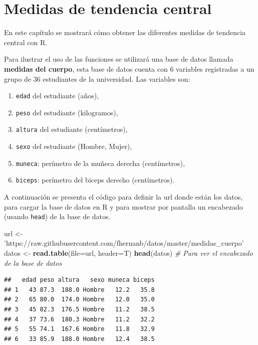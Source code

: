 \documentclass[10pt,]{krantz}
\makeatletter
\newenvironment{Shaded}{\begin{snugshade}}{\end{snugshade}}
\newcommand{\KeywordTok}[1]{\textcolor[rgb]{0.13,0.29,0.53}{\textbf{{#1}}}}
\newcommand{\DataTypeTok}[1]{\textcolor[rgb]{0.13,0.29,0.53}{{#1}}}
\newcommand{\StringTok}[1]{\textcolor[rgb]{0.31,0.60,0.02}{{#1}}}
\newcommand{\CommentTok}[1]{\textcolor[rgb]{0.56,0.35,0.01}{\textit{{#1}}}}
\newcommand{\NormalTok}[1]{{#1}}
\providecommand{\tightlist}{%
  \setlength{\itemsep}{0pt}\setlength{\parskip}{0pt}}
\let\proglang=\textsf
\newenvironment{kframe}{%
\medskip{}
\setlength{\fboxsep}{.8em}
 \def\at@end@of@kframe{}%
 \ifinner\ifhmode%
  \def\at@end@of@kframe{\end{minipage}}%
  \begin{minipage}{\columnwidth}%
 \fi\fi%
 \def\FrameCommand##1{\hskip\@totalleftmargin \hskip-\fboxsep
 \colorbox{shadecolor}{##1}\hskip-\fboxsep
     \hskip-\linewidth \hskip-\@totalleftmargin \hskip\columnwidth}%
 \MakeFramed {\advance\hsize-\width
   \@totalleftmargin\z@ \linewidth\hsize
   \@setminipage}}%
 {\par\unskip\endMakeFramed%
 \at@end@of@kframe}
\renewenvironment{Shaded}{\begin{kframe}}{\end{kframe}}
\makeatother
\begin{document}
\chapter{\texorpdfstring{Medidas de tendencia central
\label{central}}{Medidas de tendencia central }}\label{medidas-de-tendencia-central}

En este capítulo se mostrará cómo obtener las diferentes medidas de
tendencia central con \proglang{R}.

Para ilustrar el uso de las funciones se utilizará una base de datos
llamada \textbf{medidas del cuerpo}, esta base de datos cuenta con 6
variables registradas a un grupo de 36 estudiantes de la universidad.
Las variables son:

\begin{enumerate}
\def\labelenumi{\arabic{enumi}.}
\tightlist
\item
  \texttt{edad} del estudiante (años),
\item
  \texttt{peso} del estudiante (kilogramos),
\item
  \texttt{altura} del estudiante (centímetros),
\item
  \texttt{sexo} del estudiante (Hombre, Mujer),
\item
  \texttt{muneca}: perímetro de la muñeca derecha (centímetros),
\item
  \texttt{biceps}: perímetro del biceps derecho (centímetros).
\end{enumerate}

A continuación se presenta el código para definir la url donde están los
datos, para cargar la base de datos en R y para mostrar por pantalla un
encabezado (usando \texttt{head}) de la base de datos.

\begin{Shaded}
\begin{Highlighting}[]
\NormalTok{url <-}\StringTok{ 'https://raw.githubusercontent.com/fhernanb/datos/master/medidas_cuerpo'}
\NormalTok{datos <-}\StringTok{ }\KeywordTok{read.table}\NormalTok{(}\DataTypeTok{file=}\NormalTok{url, }\DataTypeTok{header=}\NormalTok{T)}
\KeywordTok{head}\NormalTok{(datos)  }\CommentTok{# Para ver el encabezado de la base de datos}
\end{Highlighting}
\end{Shaded}

\begin{verbatim}
##   edad peso altura   sexo muneca biceps
## 1   43 87.3  188.0 Hombre   12.2   35.8
## 2   65 80.0  174.0 Hombre   12.0   35.0
## 3   45 82.3  176.5 Hombre   11.2   38.5
## 4   37 73.6  180.3 Hombre   11.2   32.2
## 5   55 74.1  167.6 Hombre   11.8   32.9
## 6   33 85.9  188.0 Hombre   12.4   38.5
\end{verbatim}
\end{document}
